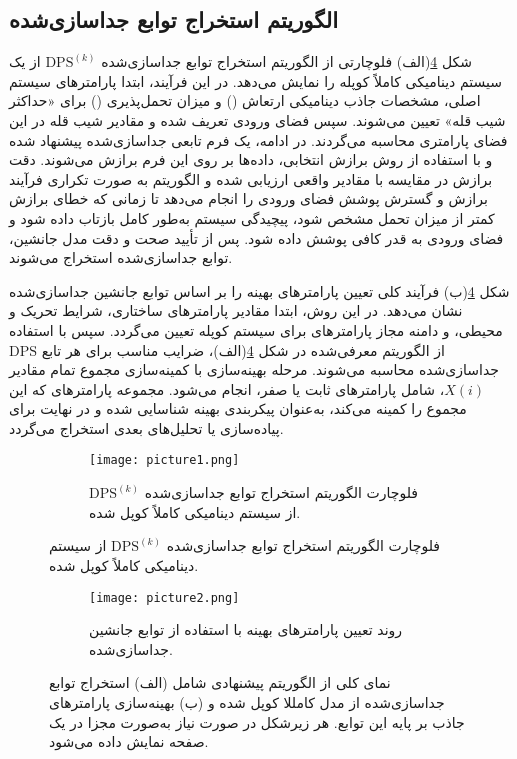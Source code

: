 \subsection{الگوریتم استخراج توابع جداسازی‌شده}
شکل \ref{fig:DPS-algorithm}(الف) فلوچارتی از الگوریتم استخراج توابع جداسازی‌شده $\mathrm{DPS}^{(k)}$ از یک سیستم دینامیکی کاملاً کوپله را نمایش می‌دهد. در این فرآیند، ابتدا پارامترهای سیستم اصلی، مشخصات جاذب دینامیکی ارتعاش () و میزان تحمل‌پذیری () برای «حداکثر شیب قله» تعیین می‌شوند. سپس فضای ورودی تعریف شده و مقادیر شیب قله در این فضای پارامتری محاسبه می‌گردند. در ادامه، یک فرم تابعی جداسازی‌شده پیشنهاد شده و با استفاده از روش برازش انتخابی، داده‌ها بر روی این فرم برازش می‌شوند. دقت برازش در مقایسه با مقادیر واقعی  ارزیابی شده و الگوریتم به صورت تکراری فرآیند برازش و گسترش پوشش فضای ورودی را انجام می‌دهد تا زمانی که خطای برازش کمتر از میزان تحمل مشخص شود، پیچیدگی سیستم به‌طور کامل بازتاب داده شود و فضای ورودی به قدر کافی پوشش داده شود. پس از تأیید صحت و دقت مدل جانشین، توابع جداسازی‌شده استخراج می‌شوند.

شکل \ref{fig:DPS-algorithm}(ب) فرآیند کلی تعیین پارامترهای بهینه  را بر اساس توابع جانشین جداسازی‌شده نشان می‌دهد. در این روش، ابتدا مقادیر پارامترهای ساختاری، شرایط تحریک و محیطی، و دامنه مجاز پارامترهای  برای سیستم کوپله تعیین می‌گردد. سپس با استفاده از الگوریتم معرفی‌شده در شکل \ref{fig:DPS-algorithm}(الف)، ضرایب مناسب برای هر تابع $\mathrm{DPS}$ جداسازی‌شده محاسبه می‌شوند. مرحله بهینه‌سازی با کمینه‌سازی مجموع تمام مقادیر $X(i)$، شامل پارامترهای ثابت یا صفر، انجام می‌شود. مجموعه پارامترهای  که این مجموع را کمینه می‌کند، به‌عنوان پیکربندی بهینه شناسایی شده و در نهایت برای پیاده‌سازی یا تحلیل‌های بعدی استخراج می‌گردد.
\begin{figure}[H]
    \centering
    \begin{subfigure}[b]{\textwidth}
        \centering
        \texttt{[image: picture1.png]}
        \caption{فلوچارت الگوریتم استخراج توابع جداسازی‌شده $\mathrm{DPS}^{(k)}$ از سیستم دینامیکی کاملاً کوپل شده.}
        \label{fig:dps-subfig1}
    \end{subfigure}
\end{figure}
\begin{figure}[H]
    \centering
    \begin{subfigure}[b]{\textwidth}
        \centering
        \texttt{[image: picture2.png]}
        \caption{روند تعیین پارامترهای بهینه  با استفاده از توابع جانشین جداسازی‌شده.}
        \label{fig:dps-subfig2}
    \end{subfigure}
    \caption{نمای کلی از الگوریتم پیشنهادی شامل (الف) استخراج توابع جداسازی‌شده  از مدل کامللا کوپل شده و (ب) بهینه‌سازی پارامترهای جاذب بر پایه این توابع. هر زیرشکل در صورت نیاز به‌صورت مجزا در یک صفحه نمایش داده می‌شود.}
    \label{fig:DPS-algorithm}
\end{figure}
